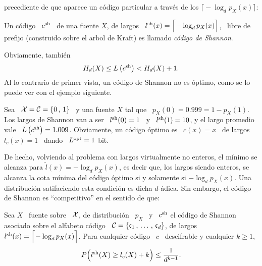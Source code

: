 precediente  de   que  aparece  un   c\'odigo  particular  a  trav\'es   de  los
$\Big\lceil\!  - \log_d p_X(x) \Big\rceil$:
%
\begin{definicion}
\label{Def:SZ:ShannonCode}
%
  Un  c\'odigo  \  $c^{\mathrm{sh}}$  \  de  una  fuente $X$,  de  largos  \  $l^{\mathrm{sh}}(x)  =
  \Big\lceil\!   - \log_d  p_X(x) \Big\rceil$,  \ libre  de  prefijo (construido
  sobre el arbol de Kraft) es llamado {\it c\'odigo de Shannon}.
\end{definicion}
%
Obviamente, tambi\'en
%
\[
H_d(X) \le L\left( c^{\mathrm{sh}}  \right) < H_d(X) +  1.
\]
%
Al lo contrario de primer vista, un  c\'odigo de Shannon no es \'optimo, como se
lo puede ver con el ejemplo siguiente.
%
\begin{ejemplo}
\label{Ej:SZ:CodigoShannonNoOpt}
%
  Sea \ $\mathcal{X}  = \mathcal{C} = \{ 0 \,  , \, 1 \}$ \  y una fuente $X$ tal que  \ $p_X(0) =
  0.999 = 1 - p_X(1)$.   Los largos de Shannon van a ser \ $l^{\mathrm{sh}}(0)  = 1$ \ y \
  $l^{\mathrm{sh}}(1) = 10$,  y el largo promedio vale \ $L\left(  c^{\mathrm{sh}} \right) = 1.009$.
  Obviamente, un c\'odigo \'optimo es \ $c(x) =  x$ \ de largos \ $l_c(x) = 1$ \
  dando \ $L^{\mathrm{opt}} = 1$ bit.
\end{ejemplo}
%
De hecho, volviendo al problema  con largos virtualmente no enteros, el m\'inimo
se alcanza para  $\widetilde{l}(x) = - \log_d p_X(x)$, es  decir que, los largos
siendo enteros, se alcanza la cota m\'inima del c\'odigo \'optimo si y solamente
si $- \log_d p_X(x)$.  Una distribuci\'on satifaciendo esta condici\'on es dicha
$d$-\'adica.   Sin embargo,  el c\'odigo  de  Shannon es  ``competitivo'' en  el
sentido de que:
%
\begin{teorema}
\label{Teo:SZ:CompetitividadCodigoShannon}
%
Sea  $X$ \ fuente  sobre \  $\mathcal{X}$, de  distribuci\'on \  $p_X$ \  y \  $c^{\mathrm{sh}}$ el
c\'odigo de Shannon asociado  sobre el alfabeto c\'odigo \ $\mathcal{C} =  \{ \mathfrak{c}_1 \, ,
\,  \ldots \, ,  \, \mathfrak{c}_d  \}$, de  largos $l^{\mathrm{sh}}(x)  = \Big\lceil\!   - \log_d
p_X(x) \Big\rceil$.  Para cualquier c\'odigo  \ $c$ \ descifrable y cualquier $k
\ge 1$,
  \[
  P\Big( l^{\mathrm{sh}}(X) \ge l_c(X) + k \Big) \le \frac{1}{d^{k-1}}.
  \]
\end{teorema}
%
